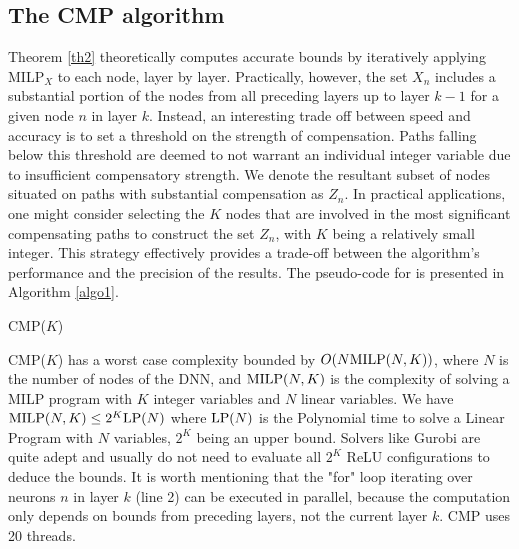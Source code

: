 \subsection{The CMP algorithm}


Theorem \ref{th2} theoretically computes accurate bounds by iteratively applying MILP$_{X}$ to each node, layer by layer. Practically, however, the set $X_n$ includes a substantial portion of the nodes from all preceding layers up to layer $k-1$ for a given node $n$ in layer $k$. Instead, an interesting trade off between speed and accuracy is to set a threshold on the strength of compensation. Paths falling below this threshold are deemed to not warrant an individual integer variable due to insufficient compensatory strength. We denote the resultant subset of nodes situated on paths with substantial compensation as $Z_n$. In practical applications, one might consider selecting the $K$ nodes that are involved in the most significant compensating paths to construct the set $Z_n$, with $K$ being a relatively small integer. This strategy effectively provides a trade-off between the algorithm's performance and the precision of the results. The pseudo-code for \CMP is presented in Algorithm \ref{algo1}.






\begin{algorithm}[b!]
	\caption{CMP($K$)}
	\label{algo1}
	
	
\end{algorithm}	




CMP($K$) has a worst case complexity bounded by $O(N {\textrm{MILP}}(N,K))$, 
where $N$ is the number of nodes of the DNN, 
and ${\textrm{MILP}}(N,K)$ is the complexity of solving a MILP program with $K$ integer variables and $N$ linear variables.
We have ${\textrm{MILP}}(N,K) \leq 2^K {\textrm{LP}}(N)$ where ${\textrm{LP}}(N)$ is the Polynomial time to solve a Linear Program with $N$ variables, $2^K$ being an upper bound. Solvers like Gurobi are quite adept and usually do not need to evaluate all $2^K$ ReLU configurations to deduce the bounds.
It is worth mentioning that the "for" loop iterating over neurons $n$ in layer $k$ (line 2) can be executed in parallel, because the computation only depends on bounds from preceding layers, not the current layer $k$. 
CMP uses 20 threads.



